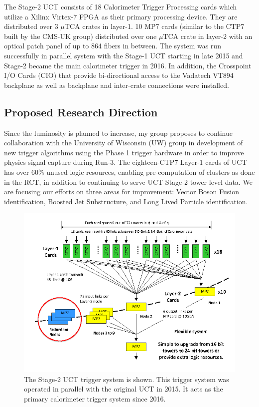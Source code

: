 \documentclass[preprint,12pt]{elsarticle}
\begin{document}
The Stage-2 UCT consists of 18 Calorimeter Trigger Processing cards which utilize a Xilinx Virtex-7 FPGA
as their primary processing device. They are distributed over 3 $\mu$TCA crates in layer-1. 10 MP7 cards 
(similar to the CTP7 built by the CMS-UK group) distributed over one
$\mu$TCA crate in layer-2 with an optical patch panel of up to 864 fibers in between. 
The system was run successfully in parallel system with the Stage-1 UCT starting in 
late 2015 and Stage-2 became the main calorimeter 
trigger in 2016. In addition, the Crosspoint I/O Cards (CIO) that provide bi-directional 
access to the Vadatech VT894 backplane as well
as backplane and inter-crate connections were installed. %

\subsection{Proposed Research Direction}
Since the luminosity is planned to increase, my group proposes to continue collaboration with the
University of Wisconsin (UW) group in development of new trigger algorithms using the Phase 1 trigger hardware in order to improve
physics signal capture during Run-3. The eighteen-CTP7 Layer-1 cards of UCT has over 60\% unused logic 
resources, enabling pre-computation of clusters as done in the RCT, in addition to continuing to serve 
UCT Stage-2 tower level data. We are focusing our efforts on three areas for improvement: Vector Boson Fusion  identification, Boosted Jet Substructure, and Long Lived Particle identification.

\begin{figure}[h]
\centering\includegraphics[width=0.5\linewidth]{stage2.png}
\caption{The Stage-2 UCT trigger system is shown. This trigger system was operated in parallel with the original UCT in 2015.
It acts as the primary calorimeter trigger system since 2016.}
\label{fig:CMS_L1_Trigger}
\end{figure}
\end{document}

